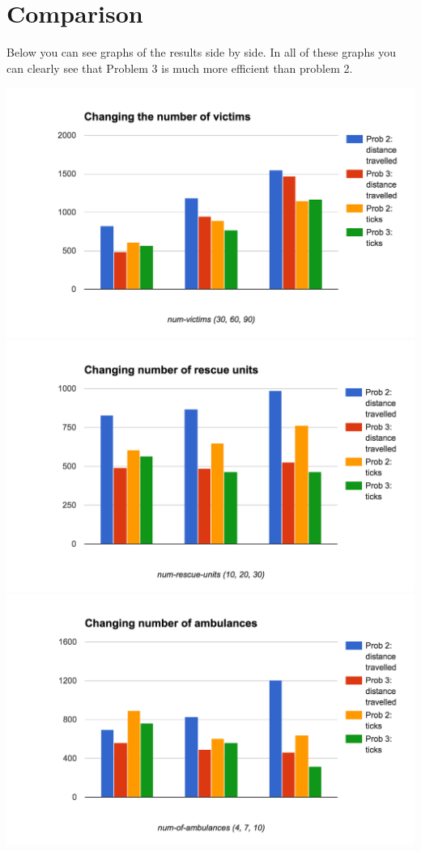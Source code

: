 \documentclass[titlepage]{article}
\begin{document}
\section{Comparison}
  Below you can see graphs of the results side by side. In all of these graphs you can clearly see that Problem 3 is much more efficient than problem 2.

  \includegraphics[width=\textwidth,height=\textheight,keepaspectratio]{3victims.png}
  \includegraphics[width=\textwidth,height=\textheight,keepaspectratio]{3rescueunits.png}
  \includegraphics[width=\textwidth,height=\textheight,keepaspectratio]{3ambs.png}
\end{document}
